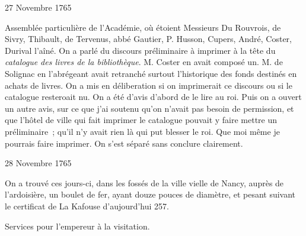                      \begin{diary}{27 Novembre 1765}{}
                        
                         Assemblée particulière de
                              l'Académie, où
                           étoient Messieurs
                           Du Rouvrois, de Sivry, Thibault,
                           de Tervenus, abbé Gautier, P.
                              Husson, Cupers,
                           André, Coster, Durival
                              l'aîné. On a parlé
                           du discours préliminaire à imprimer à la tête
                           du \emph{catalogue des livres
                                 de la bibliothèque}. M.
                              Coster en avait composé un. M. de Solignac
                           en l'abrégeant avait retranché surtout l'historique
                           des fonds destinés en achats de livres. On a
                           mis en déliberation si on imprimerait ce
                           discours ou si le catalogue resteroait nu. On a
                           été d'avis d'abord de le lire au roi. Puis on a
                           ouvert un autre avis, sur ce que j'ai soutenu
                           qu'on n'avait pas besoin de permission, et que
                           l'hôtel de ville qui fait imprimer
                           le catalogue
                           pouvait y faire mettre un préliminaire ;
                           qu'il n'y avait rien là qui put blesser le roi.
                           Que moi même je pourrais faire imprimer.
                           On s'est séparé sans conclure clairement. \bigskip
        
        
                     \end{diary}

                     \begin{diary}{28 Novembre 1765}{}
                        
                         On a trouvé ces jours-ci, dans les
                           fossés de la
                              ville vielle de Nancy, auprès de l'ardoisière, un
                           boulet de fer, ayant douze pouces de diamètre,
                           et pesant suivant le certificat de La
                              Kafouse
                           d'aujourd'hui 257. \bigskip
        
        
                         Services pour l'empereur à la visitation. \bigskip
        
        
                     \end{diary}

